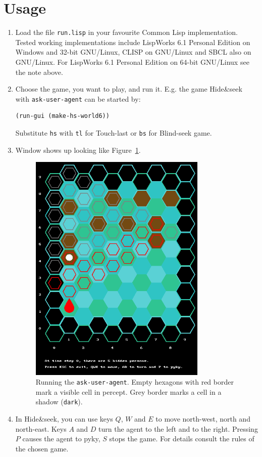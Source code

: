 \documentclass[a4paper,12pt]{article}
\begin{document}
\section*{Usage}
\begin{enumerate}
\item Load the file \texttt{run.lisp} in your favourite Common Lisp implementation. Tested working implementations
include LispWorks 6.1 Personal Edition on Windows and 32-bit GNU/Linux, CLISP on GNU/Linux and SBCL also on GNU/Linux. For
LispWorks 6.1 Personal Edition on 64-bit GNU/Linux see the note above.

\item Choose the game, you want to play, and run it. E.g. the game Hide\&seek with \texttt{ask-user-agent} can be started by:
\begin{verbatim}
(run-gui (make-hs-world6))
\end{verbatim}
Substitute \texttt{hs} with \texttt{tl} for Touch-last or \texttt{bs} for Blind-seek game.

\item Window shows up looking like Figure~\ref{fig:ask-user-agent}.

\begin{figure}\centering \includegraphics[width=0.8\textwidth]{images/ask-user-agent} \caption[Spuštění agenta
\texttt{ask-user-agent}.]{Running the \texttt{ask-user-agent}. Empty hexagons with red border mark a visible cell
	in percept. Grey border marks a cell in a shadow (\texttt{dark}).}\label{fig:ask-user-agent}
\end{figure}

\item In Hide\&seek, you can use keys $Q$, $W$ and $E$ to move north-west, north and north-east. Keys $A$ and $D$ turn
the agent to the left and to the right. Pressing $P$ causes the agent to pyky, $S$ stops the game. For details consult the rules of the
chosen game.
\end{enumerate}
\end{document}
